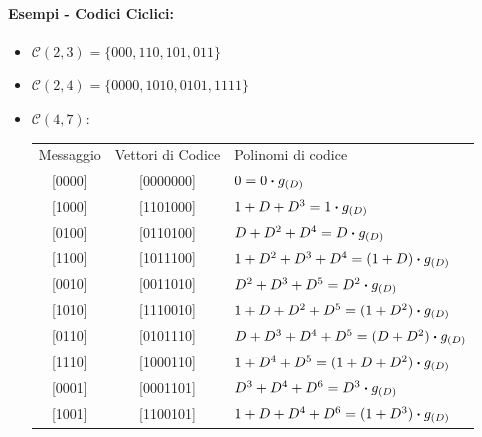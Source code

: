             \paragraph{Esempi - Codici Ciclici:}
                \begin{itemize}
                    \item {
                        $\mathcal{C}(2,3) = \{000,110,101,011\}$
                    }
                    \item {
                        $\mathcal{C}(2,4) = \{0000,1010,0101,1111\}$ 
                    }
                    \item {
                        $\mathcal{C}(4,7)$:\label{codice 47}
                        \begin{table}[H]
                            \centering
                            \begin{tabular}{ccl}
                            \cline{1-3}
                            Messaggio  & Vettori di Codice & Polinomi di codice \\ \cline{1-3}
                            {[}0000{]} & {[}0000000{]}     &$0=                                    0\dotproduct g_{(D)}$\\
                            {[}1000{]} & {[}1101000{]}     &$1+D+D^3 =1                             \dotproduct g_{(D)}$\\
                            {[}0100{]} & {[}0110100{]}     &$D+D^2+D^4 =                           D\dotproduct g_{(D)}$\\
                            {[}1100{]} & {[}1011100{]}     &$1+D^2+D^3+D^4 =                   (1+D)\dotproduct g_{(D)}$\\
                            {[}0010{]} & {[}0011010{]}     &$D^2+D^3+D^5 =                       D^2\dotproduct g_{(D)}$\\
                            {[}1010{]} & {[}1110010{]}     &$1+D+D^2+D^5 =                   (1+D^2)\dotproduct g_{(D)}$\\
                            {[}0110{]} & {[}0101110{]}     &$D+D^3+D^4+D^5 =                 (D+D^2)\dotproduct g_{(D)}$\\
                            {[}1110{]} & {[}1000110{]}     &$1+D^4+D^5 =                   (1+D+D^2)\dotproduct g_{(D)}$\\ 
                            {[}0001{]} & {[}0001101{]}     &$D^3+D^4+D^6 =                       D^3\dotproduct g_{(D)}$\\
                            {[}1001{]} & {[}1100101{]}     &$1+D+D^4+D^6 =                   (1+D^3)\dotproduct g_{(D)}$\\

\end{tabular}
\end{table}}
\end{itemize}
